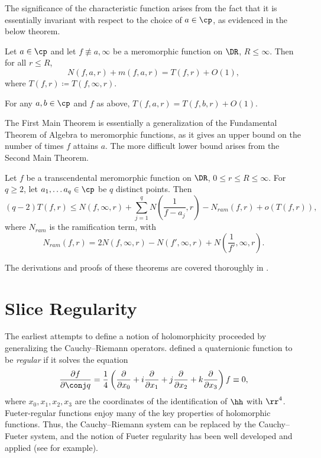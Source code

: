 \documentclass{amsart}
\begin{document}
The significance of the characteristic function arises from the fact that it is essentially invariant with respect to the choice of $a\in\cp$, as evidenced in the below theorem. 

\begin{teo}\label{FirstMainTheorem}
    Let $a\in\cp$ and let $f\not\equiv a,\infty$ be a meromorphic function on $\DR$, $R\leq\infty$. Then for all $r\leq R$, \[N(f,a,r)+m(f,a,r)=T(f,r)+O(1),\] where $T(f,r)\coloneq T(f,\infty,r)$.  
\end{teo}
\begin{corr}
    For any $a,b\in\cp$ and $f$ as above, $T(f,a,r)=T(f,b,r)+O(1)$. 
\end{corr}

The First Main Theorem is essentially a generalization of the Fundamental Theorem of Algebra to meromorphic functions, as it gives an upper bound on the number of times $f$ attains $a$. The more difficult lower bound arises from the Second Main Theorem. 

\begin{teo}
    Let $f$ be a transcendental meromorphic function on $\DR$, $0\leq r\leq R\leq \infty$. For $q\geq 2$, let $a_1,\dots a_q\in\cp$ be $q$ distinct points. Then \[(q-2)T(f,r)\leq N(f,\infty,r)+\sum_{j=1}^q N\left(\frac1{f-a_j},r\right)-N_{ram}(f,r)+o(T(f,r)),\] where $N_{ram}$ is the ramification term, with \[N_{ram}(f,r)=2N(f,\infty,r)-N(f',\infty,r)+N\left(\frac1{f'},\infty,r\right).\] 
\end{teo}

The derivations and proofs of these theorems are covered thoroughly in \cite{cherry2001nevanlinna}. 

\section{Slice Regularity}\label{qanal}

The earliest attempts to define a notion of holomorphicity proceeded by generalizing the Cauchy--Riemann operators. \cite{fueter35} defined a quaternionic function to be \emph{regular} if it solves the equation \[\frac{\partial f}{\partial \conj q}=\frac14\left(\frac{\partial }{\partial x_0}+i\frac{\partial }{\partial x_1}+j\frac{\partial }{\partial x_2}+k\frac{\partial }{\partial x_3}\right)f\equiv 0,\] where $x_0,x_1,x_2,x_3$ are the coordinates of the identification of $\hh$ with $\rr^4$. Fueter-regular functions enjoy many of the key properties of holomorphic functions. Thus, the Cauchy--Riemann system can be replaced by the Cauchy--Fueter system, and the notion of Fueter regularity has been well developed and applied (see \cite{sudbery1979, gurlebeck1990, kravchenko1996} for example). 
\end{document}
